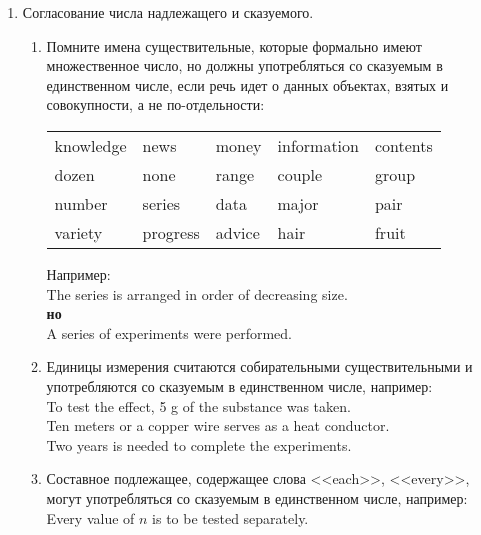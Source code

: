 \documentclass[a5paper, 10pt, twoside, numbers=enddot]{scrartcl}
\begin{document}
\begin{enumerate}
  \item Согласование числа надлежащего и сказуемого.
    \begin{enumerate}
      \item Помните имена существительные, которые формально имеют множественное число, но должны
        употребляться со сказуемым в единственном числе, если речь идет о данных объектах, взятых и
        совокупности, а не по-отдельности:
        \begin{center}
          \sffamily
          \begin{tabular}{lllll}
            knowledge & news     & money  & information & contents\\
            dozen     & none     & range  & couple      & group\\
            number    & series   & data   & major       & pair\\
            variety   & progress & advice & hair        & fruit
          \end{tabular}
        \end{center}
        Например:\\ [4pt]
        \textsf{
          The series is arranged in order of decreasing size.\\ [4pt]
          \textbf{но}\\ [4pt]
          A series of experiments were performed.
        }

      \item Единицы измерения считаются собирательными существительными и употребляются со сказуемым
        в единственном числе, например:\\ [4pt]
        \textsf{
          To test the effect, 5 g of the substance was taken.\\ [4pt]
          Ten meters or a copper wire  serves as a heat conductor.\\ [4pt]
          Two years is needed to complete the experiments.
        }

      \item Составное подлежащее, содержащее слова <<each>>, <<every>>, могут употребляться со
        сказуемым в единственном числе, например:\\ [4pt]
        \textsf{Every value of $n$ is to be tested separately.}
    \end{enumerate}


\end{enumerate}
\end{document}
